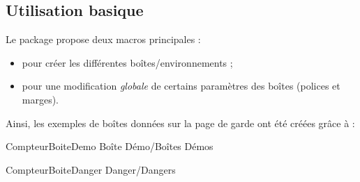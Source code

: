 \documentclass[french,11pt,a4paper]{article}
\begin{document}
\pagebreak

\subsection{Utilisation basique}

Le package propose deux macros principales :

\begin{itemize}
	\item {} pour créer les différentes boîtes/environnements ;
	\item {} pour une modification \textit{globale} de certains paramètres des boîtes (polices et marges).
\end{itemize}

\medskip

\begin{codehigh}[language=latex/latex2,style/main=cyan!10,style/code=cyan!10]
\ParamBoites[Clés]
\end{codehigh}

\medskip

Ainsi, les exemples de boîtes données sur la page de garde ont été créées grâce à :

\begin{codehigh}[language=latex/latex2,style/main=cyan!10,style/code=cyan!10]
    {CompteurBoiteDemo}            %
    {\faIcons}                     %
    {Boîte Démo/Boîtes Démos}      %

    {CompteurBoiteDanger}          %
    {\faBomb}                      %
    {Danger/Dangers}               %
\end{codehigh}

\begin{demohigh}[language=latex/latex2,style/main=cyan!10,style/code=cyan!10]
\setcounter{CompteurBoiteDemo}{0}
\setcounter{CompteurBoiteDanger}{0}
\begin{BoiteDeDemo}
    \lipsum[1][1]
\end{BoiteDeDemo}

\begin{BoiteDanger}
    \lipsum[2][1]
\end{BoiteDanger}
\end{demohigh}
\end{document}
